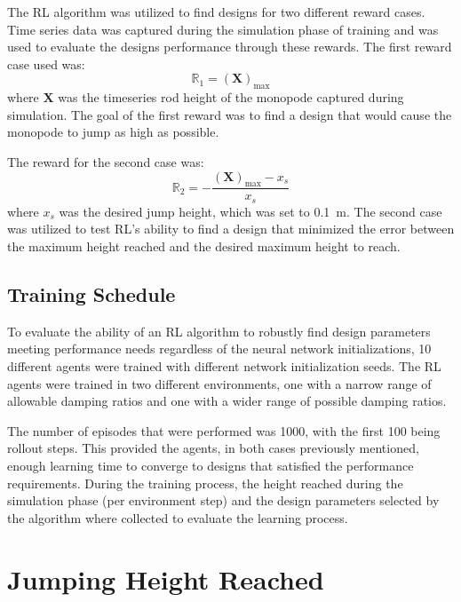 \documentclass[10pt,twocolumn,letterpaper]{article}
\begin{document}
The RL algorithm was utilized to find designs for two different reward cases. Time series data was captured during the simulation phase of training and was used to evaluate the designs performance through these rewards. The first reward case used was:
%
\begin{equation}
        \mathbb{R}_1 = \left (\textbf{X}  \right )_{\text{max}}
\end{equation}
% 
where $\textbf{X}$ was the timeseries rod height of the monopode captured during simulation. The goal of the first reward was to find a design that would cause the monopode to jump as high as possible.

The reward for the second case was:
%
\begin{equation}
        \mathbb{R}_2 = - \frac{\left (\textbf{X}  \right )_{\text{max}} - x_{s}}{x_{s}}
\end{equation}
%
where $x_s$ was the desired jump height, which was set to 0.1~m. The second case was utilized to test RL's ability to find a design that minimized the error between the maximum height reached and the desired maximum height to reach. 

\subsection{Training Schedule}

To evaluate the ability of an RL algorithm to robustly find design parameters meeting performance needs regardless of the neural network initializations, 10 different agents were trained with different network initialization seeds. The RL agents were trained in two different environments, one with a narrow range of allowable damping ratios and one with a wider range of possible damping ratios.

The number of episodes that were performed was 1000, with the first 100 being rollout steps. This provided the agents, in both cases previously mentioned, enough learning time to converge to designs that satisfied the performance requirements. During the training process, the height reached during the simulation phase (per environment step) and the design parameters selected by the algorithm where collected to evaluate the learning process. 

\section{Jumping Height Reached} 
\label{sec:results}
\end{document}
